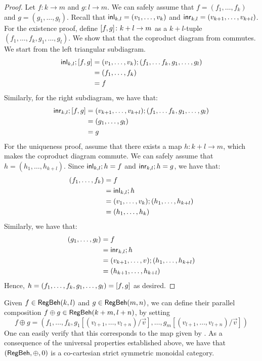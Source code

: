 \begin{proof}
	Let $f \colon k \to m$ and $g \colon l \to m$. We can safely assume that $f = (f_1, \dots, f_k)$ and $g = (g_1, \dots, g_l)$. Recall that $\mathsf{inl}_{k,l} = (v_1, \dots, v_k)$ and $\mathsf{inr}_{k,l} = (v_{k+1}, \dots, v_{k+l})$. For the existence proof, define $[ f , g ] \colon k + l \to m$ as a $k + l$-tuple $(f_1, \dots, f_k, g_1, \dots, g_l)$. We show that that the coproduct diagram from  commutes. We start from the left triangular subdiagram.
	\begin{align*}
		\mathsf{inl}_{k,l} ; [ f , g] &= (v_1, \dots, v_k) ; (f_1, \dots f_k, g_1, \dots, g_l) \\
		&= (f_1, \dots, f_k) \\
		&= f
	\end{align*}
	Similarly, for the right subdiagram, we have that:
	\begin{align*}
		\mathsf{inr}_{k,l} ; [ f , g] &= (v_{k +1}, \dots, v_{k + l}) ; (f_1, \dots f_k, g_1, \dots, g_l) \\
		&= (g_1, \dots, g_l) \\
		&= g
	\end{align*}
	For the uniqueness proof, assume that there exists a map $h \colon k + l \to m$, which makes the coproduct diagram commute. We can safely assume that $h = (h_1, \dots, h_{k + l})$. 
	Since $\mathsf{inl}_{k,l} ; h = f$ and $\mathsf{inr}_{k,l} ; h = g$, we have that:
	\begin{align*}
		(f_1, \dots, f_k) &= f\\ 
		&= \mathsf{inl}_{k,l} ; h\\
		&= (v_1, \dots, v_k) ; (h_1, \dots, h_{k + l}) \\
		&= (h_1, \dots, h_k)
	\end{align*}
	Similarly, we have that:
	\begin{align*}
		(g_1, \dots, g_l) &= f\\ 
		&= \mathsf{inr}_{k,l} ; h\\
		&= (v_{k+1}, \dots, v_{}) ; (h_1, \dots, h_{k + l}) \\
		&= (h_{k+1}, \dots, h_{k + l})
	\end{align*}
	Hence, $h = (f_1, \dots, f_k, g_1, \dots, g_l) = [ f , g ]$ as desired. 
\end{proof}
Given $f \in \mathsf{RegBeh}(k,l)$ and $g \in \mathsf{RegBeh}(m,n)$, we can define their parallel composition $f \oplus g \in \mathsf{RegBeh}(k + m, l + n)$, by setting $$f \oplus g = (f_1, \dots, f_k, g_1[(v_{l + 1},\dots, v_{l + n})/\vec{v}], \dots, g_m[(v_{l + 1},\dots, v_{l + n})/\vec{v}])$$ One can easily verify that this corresponds to the map given by . As a consequence of the universal properties established above, we have that $(\mathsf{RegBeh}, \oplus , 0 )$ is a co-cartesian strict symmetric monoidal category. 
